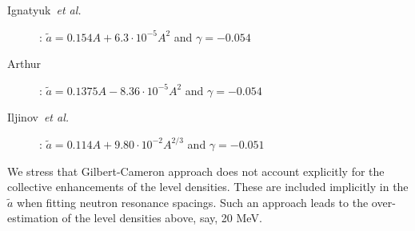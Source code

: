 \documentclass[twocolumn,amsmath,amssymb,10pt,groupedaddress,a4paper]{revtex4}
\begin{document}
\begin{description}
\item[Ignatyuk~\emph{et al.}~\cite{ignaa}]: $\widetilde{a}=0.154A+6.3\cdot10^{-5}A^{2}$
and $\gamma=-0.054$
\item[Arthur~\cite{arthura}]: $\widetilde{a}=0.1375A-8.36\cdot10^{-5}A^{2}$
and $\gamma=-0.054$
\item[Iljinov~\emph{et al.}~\cite{Mebel}]: $\widetilde{a}=0.114A+9.80\cdot10^{-2}A^{2/3}$
and $\gamma=-0.051$
\end{description}
We stress that Gilbert-Cameron approach does not account explicitly
for the collective enhancements of the level densities.
These are included implicitly in the $\widetilde{a}$ when fitting
neutron resonance spacings. Such an approach leads to the over-estimation
of the level densities above, say, 20 MeV.
\end{document}
